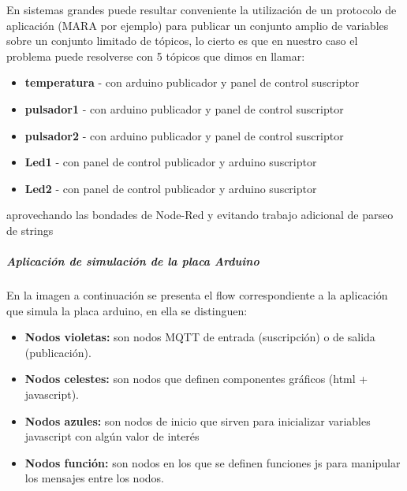 \documentclass[11pt]{extarticle}
\begin{document}
En sistemas grandes puede resultar conveniente la utilización de un
protocolo de aplicación (MARA por ejemplo) para publicar un conjunto
amplio de variables sobre un conjunto limitado de tópicos, lo cierto es
que en nuestro caso el problema puede resolverse con 5 tópicos que dimos
en llamar:

\begin{itemize}
\item
  \textbf{temperatura} - con arduino publicador y panel de control
  suscriptor
\item
  \textbf{pulsador1} - con arduino publicador y panel de control
  suscriptor
\item
  \textbf{pulsador2} - con arduino publicador y panel de control
  suscriptor
\item
  \textbf{Led1} - con panel de control publicador y arduino suscriptor
\item
  \textbf{Led2} - con panel de control publicador y arduino suscriptor
\end{itemize}

aprovechando las bondades de Node-Red y evitando trabajo adicional de
parseo de strings

    \hypertarget{aplicaciuxf3n-de-simulaciuxf3n-de-la-placa-arduino}{%
\subparagraph{Aplicación de simulación de la placa
Arduino}\label{aplicaciuxf3n-de-simulaciuxf3n-de-la-placa-arduino}}

En la imagen a continuación se presenta el flow correspondiente a la
aplicación que simula la placa arduino, en ella se distinguen:

\begin{itemize}
\item
  \textbf{Nodos violetas:} son nodos MQTT de entrada (suscripción) o de
  salida (publicación).
\item
  \textbf{Nodos celestes:} son nodos que definen componentes gráficos
  (html + javascript).
\item
  \textbf{Nodos azules:} son nodos de inicio que sirven para inicializar
  variables javascript con algún valor de interés
\item
  \textbf{Nodos función:} son nodos en los que se definen funciones js
  para manipular los mensajes entre los nodos.
\end{itemize}
\end{document}
